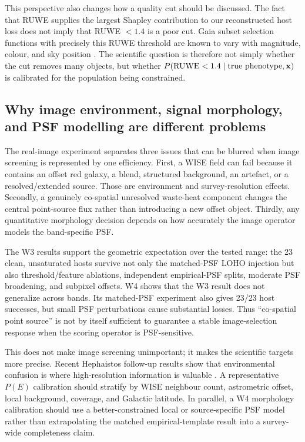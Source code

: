 \documentclass[fleqn,usenatbib]{mnras}
\begin{document}
This perspective also changes how a quality cut should be discussed. The fact that RUWE supplies the largest Shapley contribution to our reconstructed host loss does not imply that RUWE $<1.4$ is a poor cut. Gaia subset selection functions with precisely this RUWE threshold are known to vary with magnitude, colour, and sky position \citep{EverallBoubert2022}. The scientific question is therefore not simply whether the cut removes many objects, but whether $P({\rm RUWE}<1.4\mid{\rm true\ phenotype},\mathbf{x})$ is calibrated for the population being constrained.

\subsection{Why image environment, signal morphology, and PSF modelling are different problems}

The real-image experiment separates three issues that can be blurred when image screening is represented by one efficiency. First, a WISE field can fail because it contains an offset red galaxy, a blend, structured background, an artefact, or a resolved/extended source. Those are environment and survey-resolution effects. Secondly, a genuinely co-spatial unresolved waste-heat component changes the central point-source flux rather than introducing a new offset object. Thirdly, any quantitative morphology decision depends on how accurately the image operator models the band-specific PSF.

The W3 results support the geometric expectation over the tested range: the 23 clean, unsaturated hosts survive not only the matched-PSF LOHO injection but also threshold/feature ablations, independent empirical-PSF splits, moderate PSF broadening, and subpixel offsets. W4 shows that the W3 result does not generalize across bands. Its matched-PSF experiment also gives 23/23 host successes, but small PSF perturbations cause substantial losses. Thus ``co-spatial point source'' is not by itself sufficient to guarantee a stable image-selection response when the scoring operator is PSF-sensitive.

This does not make image screening unimportant; it makes the scientific targets more precise. Recent Hephaistos follow-up results show that environmental confusion is where high-resolution information is valuable \citep{Ren2025,Ren2026,Zackrisson2026}. A representative $P(E)$ calibration should stratify by WISE neighbour count, astrometric offset, local background, coverage, and Galactic latitude. In parallel, a W4 morphology calibration should use a better-constrained local or source-specific PSF model rather than extrapolating the matched empirical-template result into a survey-wide completeness claim.
\end{document}
